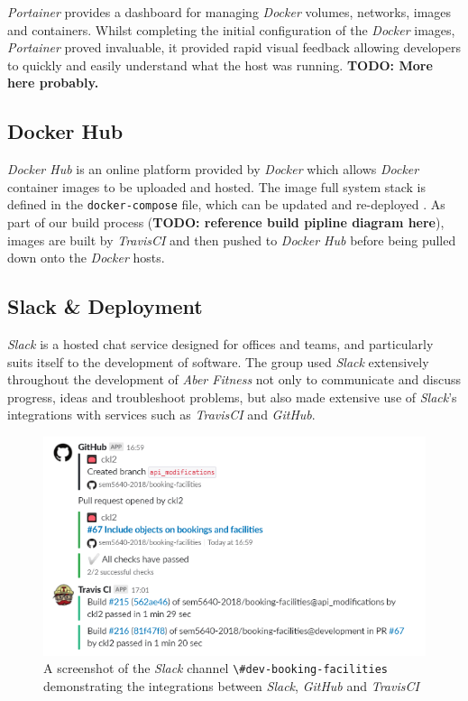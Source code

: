 \par
\textit{Portainer} provides a dashboard for managing \textit{Docker} volumes, networks, images and containers. Whilst completing the initial configuration of the \textit{Docker} images, \textit{Portainer} proved invaluable, it provided rapid visual feedback allowing developers to quickly and easily understand what the host was running. \textbf{TODO: More here probably.}

\subsection{Docker Hub}
\par
\textit{Docker Hub} is an online platform provided by \textit{Docker} which allows \textit{Docker} container images to be uploaded and hosted. The image full system stack is defined in the \lstinline{docker-compose} file, which can be updated and re-deployed . As part of our build process (\textbf{TODO: reference build pipline diagram here}), images are built by \textit{TravisCI} and then pushed to \textit{Docker Hub} before being pulled down onto the \textit{Docker} hosts.


\subsection{Slack \& Deployment}
\par
\textit{Slack} is a hosted chat service designed for offices and teams, and particularly suits itself to the development of software. The group used \textit{Slack} extensively throughout the development of \textit{Aber Fitness} not only to communicate and discuss progress, ideas and troubleshoot problems, but also made extensive use of \textit{Slack}'s integrations with services such as \textit{TravisCI} and \textit{GitHub}. 

\begin{figure}[H]
    \centering
    \includegraphics[width=\textwidth]{Images/Slack_Travis_GitHub.png}
    \caption{A screenshot of the \textit{Slack} channel \lstinline{\#dev-booking-facilities} demonstrating the integrations between \textit{Slack}, \textit{GitHub} and \textit{TravisCI}}
\end{figure}

